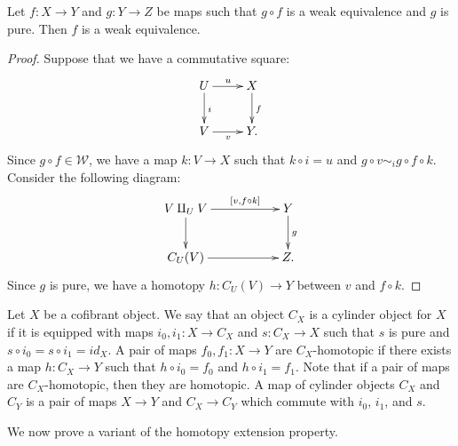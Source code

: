 \documentclass{amsart}
\theoremstyle{definition}
\newcommand{\we}{\mathcal{W}}
\newcommand{\cyli}{i}
\begin{document}
\begin{lem}
Let $f : X \to Y$ and $g : Y \to Z$ be maps such that $g \circ f$ is a weak equivalence and $g$ is pure.
Then $f$ is a weak equivalence.
\end{lem}
\begin{proof}
Suppose that we have a commutative square:
\[ \xymatrix{ U \ar[r]^u \ar[d]^i & X \ar[d]^f \\
              V \ar[r]_v          & Y.
            } \]
Since $g \circ f \in \we$, we have a map $k : V \to X$ such that $k \circ i = u$ and $g \circ v \sim_i g \circ f \circ k$.
Consider the following diagram:
\[ \xymatrix{ V \amalg_U V \ar[rr]^-{[v, f \circ k]} \ar[d] & & Y \ar[d]^g \\
              C_U(V)       \ar[rr]                          & & Z.
            } \]
Since $g$ is pure, we have a homotopy $h : C_U(V) \to Y$ between $v$ and $f \circ k$.
\end{proof}

Let $X$ be a cofibrant object.
We say that an object $C_X$ is a cylinder object for $X$ if it is equipped with maps $\cyli_0,\cyli_1 : X \to C_X$
and $s : C_X \to X$ such that $s$ is pure and $s \circ \cyli_0 = s \circ \cyli_1 = id_X$.
A pair of maps $f_0,f_1 : X \to Y$ are $C_X$-homotopic if there exists a map
$h : C_X \to Y$ such that $h \circ \cyli_0 = f_0$ and $h \circ \cyli_1 = f_1$.
Note that if a pair of maps are $C_X$-homotopic, then they are homotopic.
A map of cylinder objects $C_X$ and $C_Y$ is a pair of maps $X \to Y$
and $C_X \to C_Y$ which commute with $\cyli_0$, $\cyli_1$, and $s$.

We now prove a variant of the homotopy extension property.
\end{document}
